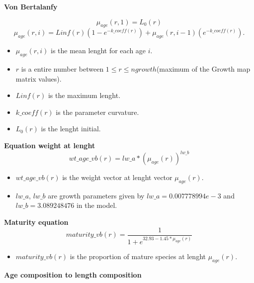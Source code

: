 \documentclass{article}
\begin{document}





\textbf{Von Bertalanfy}

\begin{equation}
    \mu_{age}(r,1)=L_0(r)
\end{equation}
\begin{equation}
    \mu_{age}(r,i)=Linf(r)(1-e^{-{k\_coeff(r)}})+\mu_{age}(r,i-1)(e^{-k\_{coeff(r)}}).
\end{equation}
 \begin{itemize}
    \item $\mu_{age}(r,i)$ is the mean lenght for each age $i$.
     \item $r$ is a entire number between $1\leq r \leq ngrowth$(maximum of the Growth map matrix values). 
     \item $Linf(r)$ is the maximum lenght.
     \item $k\_coeff(r)$ is the parameter curvature.
     \item $L_0(r)$ is the lenght initial.
     
 \end{itemize}
\textbf{Equation weight at lenght}\\
\begin{equation}
     wt\_age\_vb(r) = lw\_a * \left(\mu_{age}(r)\right)^{lw\_b}
 \end{equation}
 \begin{itemize}
     \item $wt\_age\_vb(r)$ is the weight vector at lenght vector $\mu_{age}(r)$.
     \item $lw\_a$, $lw\_b$ are growth parameters given by  $lw\_a=0.007778994e-3$ and $lw\_b=3.089248476$ in the model.
 \end{itemize}
 \textbf{Maturity equation}\\
 \begin{equation}
    maturity\_vb(r) = \dfrac{1}{1+e^{32.93-1.45*\mu_{age}(r)}}
\end{equation}
\begin{itemize}
    \item $maturity\_vb(r)$ is the proportion of mature species at lenght $\mu_{age}(r)$.
\end{itemize}
\textbf{Age composition to length composition}\\
\end{document}
